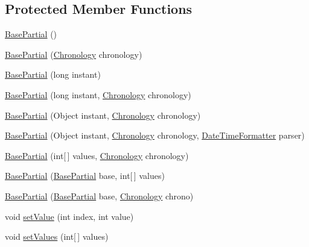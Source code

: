\subsection*{Protected Member Functions}
\begin{DoxyCompactItemize}
\item 
\hyperlink{classorg_1_1joda_1_1time_1_1base_1_1_base_partial_a3cff29e9c6137e900793681e9128be3e}{Base\-Partial} ()
\item 
\hyperlink{classorg_1_1joda_1_1time_1_1base_1_1_base_partial_a8f343f800a444450fa650ed3e2e415c7}{Base\-Partial} (\hyperlink{classorg_1_1joda_1_1time_1_1_chronology}{Chronology} chronology)
\item 
\hyperlink{classorg_1_1joda_1_1time_1_1base_1_1_base_partial_ab39a61f2e37443d0600c4c90b36c41ed}{Base\-Partial} (long instant)
\item 
\hyperlink{classorg_1_1joda_1_1time_1_1base_1_1_base_partial_a3ee1e7003a3c645bcca7c08162dfca81}{Base\-Partial} (long instant, \hyperlink{classorg_1_1joda_1_1time_1_1_chronology}{Chronology} chronology)
\item 
\hyperlink{classorg_1_1joda_1_1time_1_1base_1_1_base_partial_a1fcc50f2f451393c7663242be200f75e}{Base\-Partial} (Object instant, \hyperlink{classorg_1_1joda_1_1time_1_1_chronology}{Chronology} chronology)
\item 
\hyperlink{classorg_1_1joda_1_1time_1_1base_1_1_base_partial_af1d226db029fb949056af24b1e77c1ce}{Base\-Partial} (Object instant, \hyperlink{classorg_1_1joda_1_1time_1_1_chronology}{Chronology} chronology, \hyperlink{classorg_1_1joda_1_1time_1_1format_1_1_date_time_formatter}{Date\-Time\-Formatter} parser)
\item 
\hyperlink{classorg_1_1joda_1_1time_1_1base_1_1_base_partial_a5bd3af030a11236d5187eb6e2f10ffd4}{Base\-Partial} (int\mbox{[}$\,$\mbox{]} values, \hyperlink{classorg_1_1joda_1_1time_1_1_chronology}{Chronology} chronology)
\item 
\hyperlink{classorg_1_1joda_1_1time_1_1base_1_1_base_partial_aef20a828af568b7553cc43cd706e8296}{Base\-Partial} (\hyperlink{classorg_1_1joda_1_1time_1_1base_1_1_base_partial}{Base\-Partial} base, int\mbox{[}$\,$\mbox{]} values)
\item 
\hyperlink{classorg_1_1joda_1_1time_1_1base_1_1_base_partial_a35a21d7a4a1de2452e7e37ef66077040}{Base\-Partial} (\hyperlink{classorg_1_1joda_1_1time_1_1base_1_1_base_partial}{Base\-Partial} base, \hyperlink{classorg_1_1joda_1_1time_1_1_chronology}{Chronology} chrono)
\item 
void \hyperlink{classorg_1_1joda_1_1time_1_1base_1_1_base_partial_a4e88a07a0560e71f2d8e2c96adf2ec31}{set\-Value} (int index, int value)
\item 
void \hyperlink{classorg_1_1joda_1_1time_1_1base_1_1_base_partial_a3eb2adde97f6ee1df812696379abba67}{set\-Values} (int\mbox{[}$\,$\mbox{]} values)
\end{DoxyCompactItemize}


